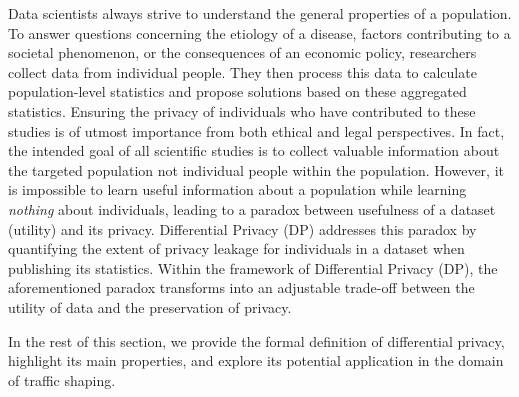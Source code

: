 Data scientists always strive to understand the general properties of a population. 
To answer questions concerning the etiology of a disease, factors contributing to a societal phenomenon, or the consequences of an economic policy, researchers collect data from individual people. They then process this data to calculate population-level statistics and propose solutions based on these aggregated statistics.
Ensuring the privacy of individuals who have contributed to these studies is of utmost importance from both ethical and legal perspectives.
In fact, the intended goal of all scientific studies is to collect valuable information about the targeted population not individual people within the population. 
However, it is impossible to learn useful information about a population while learning \textit{nothing} about individuals, leading to a paradox between usefulness of a dataset (\ie utility) and its privacy. 
Differential Privacy (DP) addresses this paradox by quantifying the extent of privacy leakage for individuals in a dataset when publishing its statistics.
Within the framework of Differential Privacy (DP), the aforementioned paradox transforms into an adjustable trade-off between the utility of data and the preservation of privacy. 

In the rest of this section, we provide the formal definition of differential privacy, highlight its main properties, and explore its potential application in the domain of traffic shaping.


%
%



